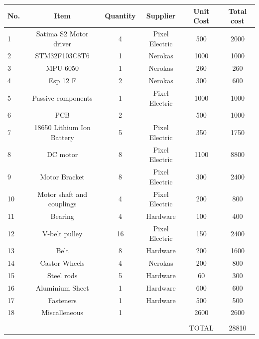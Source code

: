 \begin{table}[H]
  \begin{center}
    \leavevmode
     \begin{tabular}{| l | c | c | c | c | c |}\hline
No. & Item & Quantity & Supplier & Unit Cost & Total cost \\\hline
1 & Satima S2 Motor driver & 4 & Pixel Electric & 500 & 2000 \\\hline
2 & STM32F103C8T6 & 1 & Nerokas & 1000 & 1000 \\\hline
3 & MPU-6050 & 1 & Nerokas & 260 & 260 \\\hline
4 & Esp 12 F & 2 & Nerokas & 300 & 600 \\\hline
5 & Passive components & 1 & Pixel Electric & 1000 & 1000 \\\hline
6 & PCB & 2 & & 500 & 1000 \\\hline
7 & 18650 Lithium Ion Battery & 5 & Pixel Electric & 350 & 1750 \\\hline
8 & DC motor & 8 & Pixel Electric & 1100 & 8800 \\\hline
9 & Motor Bracket & 8 & Pixel Electric & 300 & 2400 \\\hline
10 & Motor shaft and couplings & 4 & Pixel Electric & 200 & 800 \\\hline
11 & Bearing & 4 & Hardware & 100 & 400 \\\hline
12 & V-belt pulley & 16 & Pixel Electric & 150 & 2400 \\\hline
13 & Belt & 8 & Hardware & 200 & 1600 \\\hline
14 & Castor Wheels & 4 & Nerokas & 200 & 800 \\\hline
15 & Steel rods & 5 & Hardware & 60 & 300 \\\hline
16 & Aluminium Sheet & 1 & Hardware & 600 & 600 \\\hline
17 & Fasteners & 1 & Hardware & 500 & 500 \\\hline
18 & Miscalleneous & 1 & & 2600 & 2600 \\\hline
& & & & & \\\hline
& & & & TOTAL & 28810 \\\hline
    \end{tabular}
    \label{table:1}
  \end{center}
\end{table}


